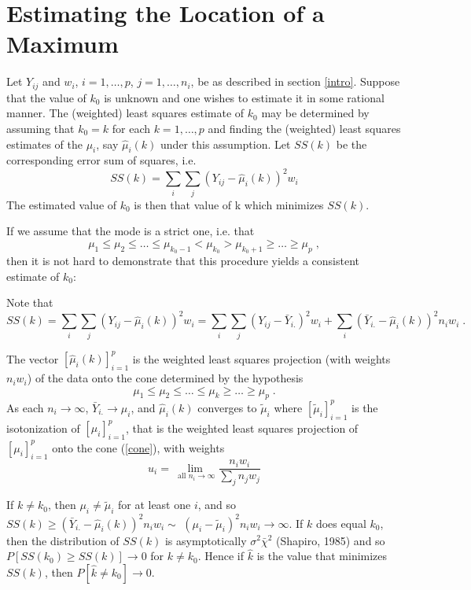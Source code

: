 \section{Estimating the Location of a Maximum}
\label{locmax}
Let $Y_{ij}$ and $w_i$, $i=1, \ldots, p$, $j = 1, \ldots, n_i$, be as
described in section \ref{intro}.  Suppose that the value of $k_0$ is
unknown and one wishes to estimate it in some rational manner.  The
(weighted) least squares estimate of $k_0$ may be determined by
assuming that $k_0 = k$ for each $k = 1, \ldots , p$ and finding the
(weighted) least squares estimates of the $\mu_i$, say
$\hat{\mu}_i(k)$ under this assumption.  Let $SS(k)$ be the
corresponding error sum of squares, i.e.
\[
SS(k) = \sum_i \sum_j (Y_{ij} - \hat{\mu}_i(k))^2 w_i
\]
The estimated value of $k_0$ is then that value of k which minimizes
$SS(k)$.

If we assume that the mode is a strict one, i.e. that
\begin{equation}
\label{unimod2}
\mu_1 \leq \mu_2 \leq \ldots \leq \mu_{k_0 - 1} < \mu_{k_0} > \mu_{k_0 + 1}
\geq \ldots \geq \mu_p \;,
\end{equation}
then it is not hard to demonstrate that this procedure yields
a consistent estimate of $k_0$:

Note that
\[
SS(k) = \sum_i \sum_j (Y_{ij} - \hat{\mu}_i(k))^2 w_i =
        \sum_i \sum_j (Y_{ij} - \bar{Y}_{i.})^2 w_i +
        \sum_i (\bar{Y}_{i.} - \hat{\mu}_i(k))^2 n_i w_i\;.
\]

The vector $[ \hat{\mu}_i(k) ]_{i=1}^p$ is the weighted least squares projection
(with weights $n_i w_i$) of the data onto the cone determined by the hypothesis
\begin{equation}
\label{cone}
\mu_1 \leq \mu_2 \leq \ldots \leq \mu_{k} \geq \ldots \geq \mu_p \;.
\end{equation}
As each $n_i \rightarrow \infty$, $\bar{Y}_{i.} \rightarrow \mu_i$,
and $\hat{\mu}_i(k)$ converges to  $\tilde{\mu}_i$ where
$[\tilde{\mu}_i]_{i=1}^p$ is the isotonization
of $[\mu_i]_{i=1}^p$, that is
the weighted least squares projection of $[\mu_i]_{i=1}^p$
onto the cone (\ref{cone}),
with weights
\[
u_i = \lim_{\mbox{ all } n_i \rightarrow \infty} \frac{n_i w_i}{\sum_j n_j w_j}
\]

If $k \neq k_0$, then $\mu_i \neq \tilde{\mu}_i$ for at
least one $i$, and so $SS(k) \geq (\bar{Y}_{i.} -
\hat{\mu}_i(k))^2 n_i w_i \sim$ \linebreak $(\mu_i -
\tilde{\mu}_i)^2 n_i w_i \rightarrow \infty$.  If $k$ does
equal $k_0$, then the distribution of $SS(k)$ is
asymptotically $\sigma^2 \bar{\chi}^2$ (Shapiro, 1985) and so
$P[SS(k_0) \geq SS(k)] \rightarrow 0$ for $k \neq k_0$.
Hence if $\hat{k}$ is the value that minimizes $SS(k)$,
then $P[\hat{k} \neq k_0] \rightarrow 0$.

